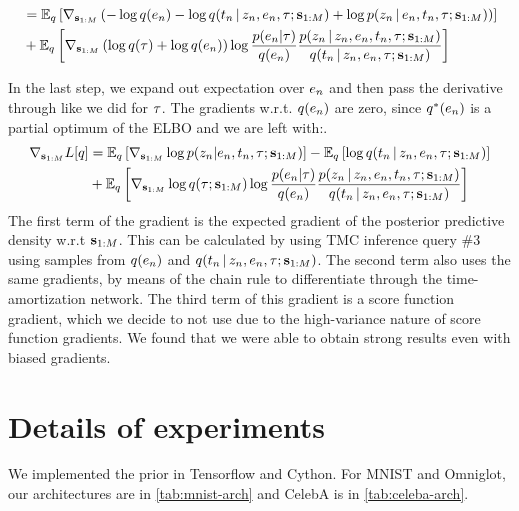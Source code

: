 \begin{equation}
\begin{split}
    &= \mathbb{E}_{q}\left[
        \nabla_{\mathbf{s}_{1:M}}\left(-\log q(e_n) - \log q(t_n \,|\, z_n, e_n, \tau; \mathbf{s}_{1:M}) + \log p(z_n \,|\, e_n, t_n, \tau; \mathbf{s}_{1:M})\right)
    \right] \\
    &+ \mathbb{E}_q\left[\nabla_{\mathbf{s}_{1:M}}\left(\log q(\tau) + \log q(e_n)\right)\log\frac{p(e_n | \tau)}{q(e_n)}\frac{p(z_n \,|\, z_n, e_n, t_n, \tau; \mathbf{s}_{1:M})}{q(t_n \,|\, z_n, e_n, \tau; \mathbf{s}_{1:M})}\right]
    \end{split}
\end{equation}

In the last step, we expand out expectation over $e_n$ and
then pass the derivative through like we did for $\tau$.
The gradients w.r.t. $q(e_n)$ are zero, since $q^*(e_n)$ is
a partial optimum of the ELBO and we are left with:.
\begin{equation}
    \begin{split}
        \nabla_{\mathbf{s}_{1:M}}L[q] &= \mathbb{E}_q\left[\nabla_{\mathbf{s}_{1:M}}\log p(z_n | e_n, t_n, \tau; \mathbf{s}_{1:M})\right] - \mathbb{E}_q\left[\log q(t_n \,|\, z_n, e_n, \tau; \mathbf{s}_{1:M})\right] \\
        &+ \mathbb{E}_q\left[\nabla_{\mathbf{s}_{1:M}} \log q(\tau; \mathbf{s}_{1:M})\log\frac{p(e_n | \tau)}{q(e_n)}\frac{p(z_n \,|\, z_n, e_n, t_n, \tau; \mathbf{s}_{1:M})}{q(t_n \,|\, z_n, e_n, \tau; \mathbf{s}_{1:M})}\right]
    \end{split}
\end{equation}
The first term of the gradient is the expected gradient
of the posterior predictive density w.r.t $\mathbf{s}_{1:M}$.
This can be calculated by using TMC inference query \#3
using samples from $q(e_n)$ and $q(t_n \,|\, z_n, e_n, \tau; \mathbf{s}_{1:M})$. The second term also uses the same gradients, by means
of the chain rule to differentiate through the time-amortization network.
The third term of this gradient is a score function gradient,
which we decide to not use due to the high-variance nature of score function gradients. We found that we were able to obtain strong results even with biased gradients.

\section{Details of experiments}
\label{sec:implementation-details}

We implemented the \acronym\;prior in Tensorflow
and Cython. 
For MNIST and Omniglot, our architectures are in \autoref{tab:mnist-arch} and CelebA is in \autoref{tab:celeba-arch}.


